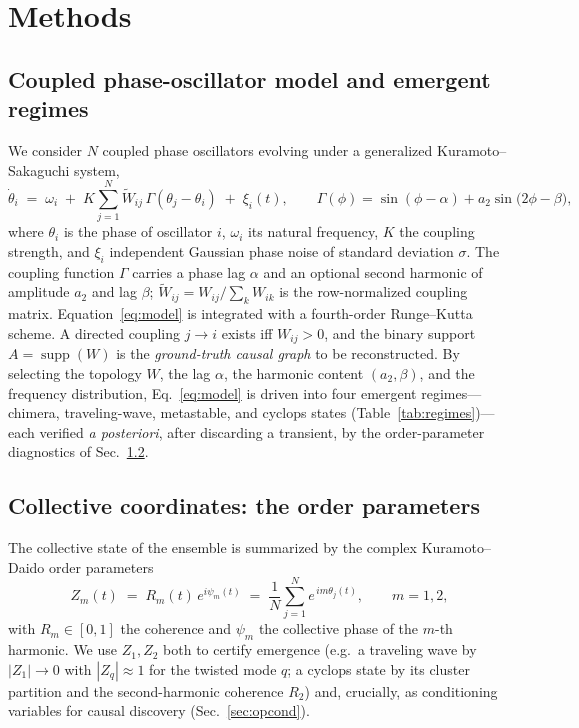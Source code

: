 
\section{Methods}
\label{sec:methods}

\subsection{Coupled phase-oscillator model and emergent regimes}
\label{sec:model}

We consider $N$ coupled phase oscillators evolving under a generalized
Kuramoto--Sakaguchi system,
\begin{equation}
\dot\theta_i \;=\; \omega_i \;+\; K\sum_{j=1}^{N}\widetilde{W}_{ij}\,
\Gamma\!\left(\theta_j-\theta_i\right)\;+\;\xi_i(t),
\qquad
\Gamma(\phi)=\sin(\phi-\alpha)+a_2\sin\!\big(2\phi-\beta\big),
\label{eq:model}
\end{equation}
where $\theta_i$ is the phase of oscillator $i$, $\omega_i$ its natural
frequency, $K$ the coupling strength, and $\xi_i$ independent Gaussian phase
noise of standard deviation $\sigma$. The coupling function $\Gamma$ carries a
phase lag $\alpha$ and an optional second harmonic of amplitude $a_2$ and lag
$\beta$; $\widetilde{W}_{ij}=W_{ij}/\sum_k W_{ik}$ is the row-normalized coupling
matrix. Equation~\eqref{eq:model} is integrated with a fourth-order
Runge--Kutta scheme. A directed coupling $j\!\to\! i$ exists iff $W_{ij}>0$, and
the binary support $A=\operatorname{supp}(W)$ is the \emph{ground-truth causal
graph} to be reconstructed. By selecting the topology $W$, the lag $\alpha$, the
harmonic content $(a_2,\beta)$, and the frequency distribution, Eq.~\eqref{eq:model}
is driven into four emergent regimes---chimera, traveling-wave, metastable, and
cyclops states (Table~\ref{tab:regimes})---each verified \emph{a posteriori},
after discarding a transient, by the order-parameter diagnostics of
Sec.~\ref{sec:orderparam}.

\subsection{Collective coordinates: the order parameters}
\label{sec:orderparam}

The collective state of the ensemble is summarized by the complex
Kuramoto--Daido order parameters
\begin{equation}
Z_m(t)\;=\;R_m(t)\,e^{i\psi_m(t)}\;=\;\frac{1}{N}\sum_{j=1}^{N}e^{\,i m\theta_j(t)},
\qquad m=1,2,
\label{eq:Zm}
\end{equation}
with $R_m\in[0,1]$ the coherence and $\psi_m$ the collective phase of the
$m$-th harmonic. We use $Z_1,Z_2$ both to certify emergence (e.g.\ a
traveling wave by $|Z_1|\!\to\!0$ with $|Z_q|\!\approx\!1$ for the twisted
mode $q$; a cyclops state by its cluster partition and the second-harmonic
coherence $R_2$) and, crucially, as conditioning variables for causal
discovery (Sec.~\ref{sec:opcond}).

